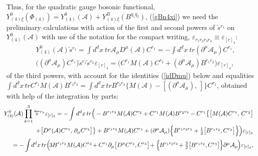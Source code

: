 \documentclass[10pt]{article}
\begin{document}
Thus,  for the quadratic gauge bosonic functional, $Y^0_{(4)\xi}(\Phi_{(4)}) = Y^0_{(4)}(\mathcal{A})+Y^B_{(4)\xi}(B^{q_1q_2})$, (\ref{gBn4xi}) we need  the preliminary calculations with action of  the first and second powers of  $\overleftarrow{s}{}^{r_1}$  on $Y^0_{(4)}(\mathcal{A})$ with use of the notation  for the compact writing, $\varepsilon_{r_1r_2r_3r_4} \equiv \varepsilon_{[r]_4}$:
\begin{eqnarray}
&& Y^0_{(4)}(\mathcal{A}) \overleftarrow{s}{}^{r_1} =  \int
d^{d}x\ tr \mathcal{ A}_{\mu } D^\mu(\mathcal{A})C^{r_1} = -\int
d^{d}x\ tr  (\partial^\mu\mathcal{ A}_{\mu }) C^{r_1}   ,\label{AAmu1}\\
  && \Big((\partial^\mu\mathcal{ A}_{\mu }) C^{r_1}\Big) \overleftarrow{s}{}^{r_1}\overleftarrow{s}{}^{r_2}\varepsilon_{[r]_4} = \Big(C^{r_1}M(\mathcal{A})  C^{r_2}  + (\partial^\mu\mathcal{ A}_{\mu })  B^{r_1r_2} \Big)\varepsilon_{[r]_4}, \label{AAmu12}
\end{eqnarray}
of the third powers, with account for the identities (\ref{idDmu})  below and equalities $\int
d^{d}x  \,tr C^{r_1}M(\mathcal{A}) B^{r_2r_3}  = \int
d^{d}x  \,tr B^{r_2r_3}\big\{M(\mathcal{A})  -[(\partial^\mu\mathcal{ A}_{\mu }), \ ]\big\}C^{r_1}$, obtained with help of  the integration by parts:
\begin{eqnarray}   \hspace{-0.5em}&\hspace{-0.5em}& \hspace{-0.5em}Y^0_{(4)}(\mathcal{A}) \prod_{k=1}^{3} \overleftarrow{s}{}^{r_k}\varepsilon_{[r]_4}=  - \int
d^{d}x  \,tr \Big(-B^{r_1r_3}M(\mathcal{A})  C^{r_2}+ C^{r_1}M(\mathcal{A})  B^{r_2r_3}-C^{r_1}\big\{\big[M(\mathcal{A})C^{r_3},\,  C^{r_2}\big]\nonumber\\
   \hspace{-0.5em}&\hspace{-0.5em}& \hspace{-0.5em}\quad   +  \big[D^\mu(\mathcal{A})C^{r_3},\,  \partial_\mu C^{r_2}\big]\big\} + B^{r_1r_2}M(\mathcal{A})C^{r_3} + (\partial^\mu\mathcal{ A}_{\mu }) \Big\{ B^{r_1r_2r_3} + \textstyle\frac{1}{2}
\big[B^{r_1r_2}, C^{r_3}\big]\Big\} \Big)\varepsilon_{[r]_4}\nonumber \\
\hspace{-0.5em}&\hspace{-0.5em}& \hspace{-0.5em}  = - \int
\hspace{-0.15em}d^{d}x  \,tr \Big(\hspace{-0.1em} 3 B^{r_1r_2}M(\mathcal{A}) C^{r_3} \hspace{-0.15em}+ C^{r_1}\partial_\mu\big[D^\mu C^{r_2},  C^{r_3}\big]\hspace{-0.15em}+ \Big\{\hspace{-0.1em} B^{r_1r_2r_3}\hspace{-0.15em} + \textstyle\frac{3}{2}
\big[B^{r_1r_2}, C^{r_3}\big]\hspace{-0.1em}\Big\}\partial^\mu\mathcal{ A}_{\mu }\hspace{-0.1em} \Big)\varepsilon_{[r]_4} ,\label{AAmu123}
\end{eqnarray}
\end{document}
